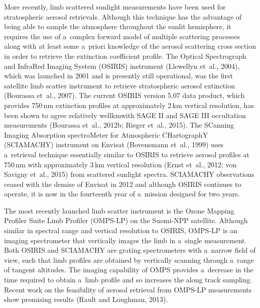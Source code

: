 \documentclass[amtd, online, hvmath]{copernicus}
\providecommand{\DIFadd}[1]{{\protect\color{blue}\uwave{#1}}} %
\providecommand{\DIFaddbegin}{} %
\providecommand{\DIFaddend}{} %
\begin{document}
More recently, limb scattered sunlight measurements have been used for
stratospheric aerosol retrievals. Although this technique has the
advantage of being able to sample the atmosphere throughout the sunlit
hemisphere, it requires the use of a~complex forward model of multiple
scattering processes along with at least some a~priori knowledge of
the aerosol scattering cross section in order to retrieve the
extinction coefficient profile. The Optical Spectrograph and InfraRed
Imaging System (OSIRIS) instrument (Llewellyn et~al., 2004), which was
launched in 2001 and is presently still operational, was the first
satellite limb scatter instrument to retrieve stratospheric aerosol
extinction (Bourassa et~al., 2007). The current OSIRIS version 5.07
data product, which provides 750\,\unit{nm} extinction profiles at
approximately 2\,\unit{km} vertical resolution, has been shown to
agree relatively well\DIFaddbegin \DIFadd{, generally below 30\% below 30\,}\unit{km}\DIFadd{, }\DIFaddend with SAGE II and SAGE III occultation
measurements  (Bourassa et~al., 2012b; Rieger et~al., 2015). The
SCanning Imaging Absorption spectroMeter for Atmospheric CHartographY
(SCIAMACHY) instrument on Envisat (Bovensmann et~al., 1999) uses
a~retrieval technique essentially similar to OSIRIS to retrieve
aerosol profiles at 750\,\unit{nm} with approximately 3\,\unit{km}
vertical resolution (\DIFaddbegin \DIFadd{Taha et al., 2011; }\DIFaddend Ernst et~al., 2012; von Savigny et~al., 2015)
from scattered sunlight spectra.  SCIAMACHY observations ceased with
the demise of Envisat in 2012 and although OSIRIS continues to
operate, it is now in the fourteenth year of a~mission designed for
two years.

The most recently launched limb scatter instrument is the Ozone
Mapping Profiler Suite Limb Profiler (OMPS-LP) on the Suomi-NPP
satellite. Although similar in spectral range and vertical resolution
to OSIRIS, OMPS-LP is an imaging spectrometer that vertically images
the limb in a~single measurement. Both OSIRIS and SCIAMACHY are
grating spectrometers with a~narrow field of view, such that limb
profiles are obtained by vertically scanning through a~range of
tangent altitudes. The imaging capability of OMPS provides a~decrease
in the time required to obtain a~limb profile and so increases the
along track sampling. Recent work on the feasibility of aerosol
retrieval from OMPS-LP measurements show promising results (Rault and
Loughman, 2013).
\end{document}
